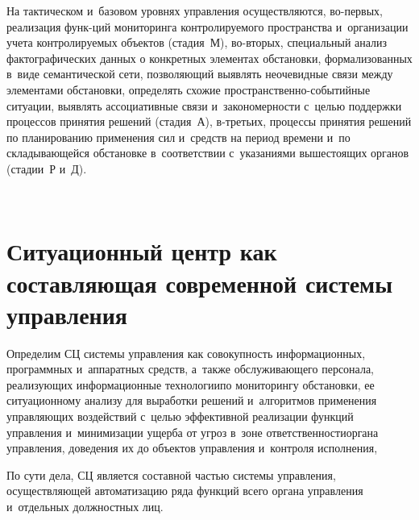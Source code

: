 \begin{multicols}{2}
    На тактическом и~базовом уровнях управления осуществляются,  
во-пер\-вых, реализация функ-\linebreak ций мониторинга контролируемого 
пространства и~организа\-ции учета контролируемых объектов (стадия~М),  
во-вто\-рых, специальный анализ фактографических данных о конкретных 
элементах обстановки, формализованных в~виде семантической сети, 
позволяющий выявлять неочевидные связи между элементами обстановки, 
определять схожие про\-стран\-ст\-вен\-но-со\-бы\-тий\-ные ситуации, выявлять 
ассоциативные связи и~закономерности с~\mbox{целью} поддержки процессов 
принятия решений (стадия~А), в-треть\-их, процессы принятия решений 
по планированию применения сил и~средств на период времени и~по 
складывающейся обстановке в~соответствии с~указаниями вышестоящих 
органов (стадии~Р и~Д).

\begin{figure*}[b] %
\vspace*{1pt}
\begin{center}
\mbox{%
\epsfxsize=160.901mm
}
\end{center}
\vspace*{-9pt}
\end{figure*}
    

\section{Ситуационный центр как составляющая современной системы 
управления}
    
    Определим СЦ сис\-те\-мы управ\-ле\-ния как совокупность 
информационных, программных и~аппаратных средств, а~также 
обслуживающего персонала, реализующих информационные технологии\linebreak по 
мониторингу обстановки, ее ситуационному анализу для выработки решений 
и~алгоритмов применения управляющих воздействий с~\mbox{целью} эффективной 
реализации функций управления и~минимизации ущерба от угроз в~зоне 
ответствен\-ности\linebreak органа управ\-ле\-ния, доведения их до объектов управ\-ле\-ния 
и~контроля исполнения,
    
    По сути дела, СЦ является составной частью сис\-те\-мы 
управ\-ле\-ния, осуществляющей автоматизацию ряда функций всего органа 
управления и~отдельных должностных лиц.
    

\end{multicols}
